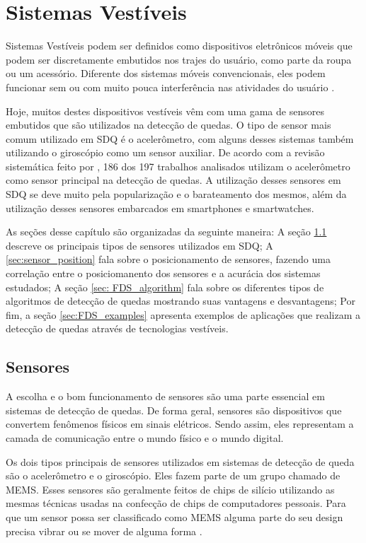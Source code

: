 \chapter{Sistemas Vestíveis} 
\label{cap:wearable_systems}

Sistemas Vestíveis podem ser definidos como dispositivos eletrônicos móveis que podem ser discretamente embutidos nos trajes do usuário, como parte da roupa ou um acessório. Diferente dos sistemas móveis convencionais, eles podem funcionar sem ou com muito pouca interferência nas atividades do usuário \citep{lukowicz2004wearable}. 

Hoje, muitos destes dispositivos vestíveis vêm com uma gama de sensores embutidos que são utilizados na detecção de quedas. O tipo de sensor mais comum utilizado em \ac{SDQ} é o acelerômetro, com alguns desses sistemas também utilizando o giroscópio como um sensor auxiliar. De acordo com a revisão sistemática feito por \cite{igual2013challenges}, 186 dos 197 trabalhos analisados utilizam o acelerômetro como sensor principal na detecção de quedas. A utilização desses sensores em \ac{SDQ} se deve muito pela popularização e o barateamento dos mesmos, além da utilização desses sensores embarcados em smartphones e smartwatches.


As seções desse capítulo são organizadas da seguinte maneira: A seção \ref{sec:sensors} descreve os principais tipos de sensores utilizados em \ac{SDQ}; A \ref{sec:sensor_position} fala sobre o posicionamento de sensores, fazendo uma correlação entre o posiciomanento dos sensores e a acurácia dos sistemas estudados; A seção \ref{sec: FDS_algorithm} fala sobre os diferentes tipos de algoritmos de detecção de quedas mostrando suas vantagens e desvantagens; Por fim, a seção \ref{sec:FDS_examples} apresenta exemplos de aplicações que realizam a detecção de quedas através de tecnologias vestíveis.



\section{Sensores}
\label{sec:sensors}
A escolha e o bom funcionamento de sensores são uma parte essencial em sistemas de detecção de quedas. De forma geral, sensores são dispositivos que convertem fenômenos físicos em sinais elétricos. Sendo assim, eles representam a camada de comunicação entre o mundo físico e o mundo digital. 

Os dois tipos principais de sensores utilizados em sistemas de detecção de queda são o acelerômetro e o giroscópio. Eles fazem parte de um grupo chamado de \ac{MEMS}. Esses sensores são geralmente feitos de chips de silício utilizando as mesmas técnicas usadas na confecção de chips de computadores pessoais. Para que um sensor possa ser classificado como \ac{MEMS} alguma parte do seu design precisa vibrar ou se mover de alguma forma \citep{milette2012professional}. 

